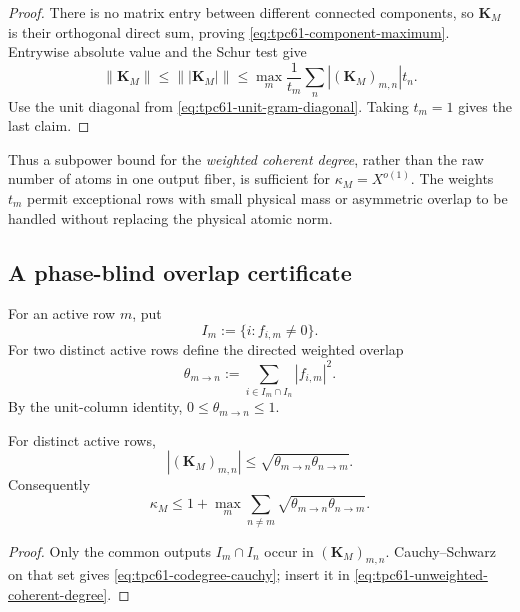 \begin{proof}
There is no matrix entry between different connected components, so
\(\mathbf K_M\) is their orthogonal direct sum, proving
\eqref{eq:tpc61-component-maximum}.  Entrywise absolute value and the
Schur test give
\[
 \|\mathbf K_M\|
 \le\bigl\||\mathbf K_M|\bigr\|
 \le
 \max_m\frac{1}{t_m}
 \sum_n|(\mathbf K_M)_{m,n}|t_n.
\]
Use the unit diagonal from
\eqref{eq:tpc61-unit-gram-diagonal}.  Taking \(t_m=1\) gives the last
claim.
\end{proof}

Thus a subpower bound for the \emph{weighted coherent degree}, rather than
the raw number of atoms in one output fiber, is sufficient for
\(\kappa_M=X^{o(1)}\).  The weights \(t_m\) permit exceptional rows with
small physical mass or asymmetric overlap to be handled without replacing
the physical atomic norm.

\subsection{A phase-blind overlap certificate}

For an active row \(m\), put
\begin{equation}
 I_m:=\{i:f_{i,m}\ne0\}.
 \label{eq:tpc61-row-output-support}
\end{equation}
For two distinct active rows define the directed weighted overlap
\begin{equation}
 \theta_{m\to n}
 :=\sum_{i\in I_m\cap I_n}|f_{i,m}|^2.
 \label{eq:tpc61-directed-overlap}
\end{equation}
By the unit-column identity, \(0\le\theta_{m\to n}\le1\).

\begin{proposition}
\label{prop:tpc61-weighted-codegree}
For distinct active rows,
\begin{equation}
 |(\mathbf K_M)_{m,n}|
 \le
 \sqrt{\theta_{m\to n}\theta_{n\to m}}.
 \label{eq:tpc61-codegree-cauchy}
\end{equation}
Consequently
\begin{equation}
 \boxed{
 \kappa_M
 \le
 1+\max_m\sum_{n\ne m}
 \sqrt{\theta_{m\to n}\theta_{n\to m}}.}
 \label{eq:tpc61-phase-blind-overlap-bound}
\end{equation}
\end{proposition}

\begin{proof}
Only the common outputs \(I_m\cap I_n\) occur in
\((\mathbf K_M)_{m,n}\).  Cauchy--Schwarz on that set gives
\eqref{eq:tpc61-codegree-cauchy}; insert it in
\eqref{eq:tpc61-unweighted-coherent-degree}.
\end{proof}

